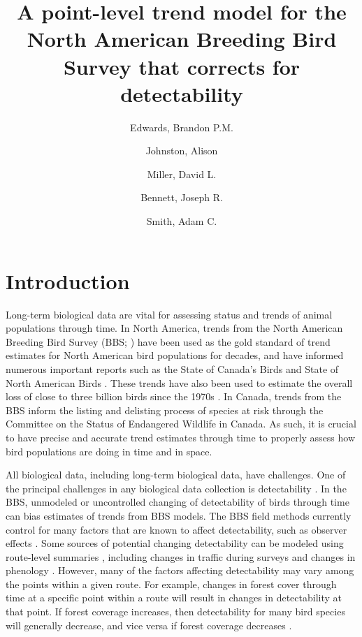 \documentclass[12pt]{article}
\title{A point-level trend model for the North American Breeding Bird Survey that corrects for detectability}
\author{
	Edwards, Brandon P.M.\\
	\and
	Johnston, Alison\\
	\and
	Miller, David L.\\
	\and
	Bennett, Joseph R.\\
	\and
	Smith, Adam C.\\
}
\begin{document}
	
	\maketitle
	
	
	
\section{Introduction}

\par Long-term biological data are vital for assessing status and trends of animal populations through time.
In North America, trends from the North American Breeding Bird Survey (BBS; \citet{sauer_first_2017, hudson_role_2017}) have been used as the gold standard of trend estimates for North American bird populations for decades, and have informed numerous important reports such as the State of Canada's Birds \citep{north_american_bird_conservation_initiative_canada_state_2019} and State of North American Birds \citep{north_american_bird_conservation_initiative_canada_state_2022}.
These trends have also been used to estimate the overall loss of close to three billion birds since the 1970s \citep{rosenberg_decline_2019}.
In Canada, trends from the BBS inform the listing and delisting process of species at risk through the Committee on the Status of Endangered Wildlife in Canada.
As such, it is crucial to have precise and accurate trend estimates through time to properly assess how bird populations are doing in time and in space.

\par All biological data, including long-term biological data, have challenges.
One of the principal challenges in any biological data collection is detectability \citep{bennett_how_2024}.
In the BBS, unmodeled or uncontrolled changing of detectability of birds through time can bias estimates of trends from BBS models.
The BBS field methods currently control for many factors that are known to affect detectability, such as observer effects \citet{sauer_observer_1994}.
Some sources of potential changing detectability can be modeled using route-level summaries \cite{smith_patterns_2023}, including changes in traffic during surveys \citep{griffith_traffic_2010} and changes in phenology \citep{english_current_2021}.
However, many of the factors affecting detectability may vary among the points within a given route.
For example, changes in forest cover through time at a specific point within a route will result in changes in detectability at that point.
If forest coverage increases, then detectability for many bird species will generally decrease, and vice versa if forest coverage decreases \citep{edwards_point_2023, yip_sound_2017}.
\end{document}
